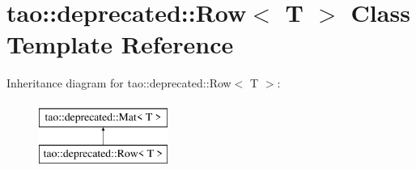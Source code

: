 \hypertarget{classtao_1_1deprecated_1_1_row}{}\section{tao\+::deprecated\+::Row$<$ T $>$ Class Template Reference}
\label{classtao_1_1deprecated_1_1_row}
Inheritance diagram for tao\+::deprecated\+::Row$<$ T $>$\+:\begin{figure}[H]
\begin{center}
\leavevmode
\includegraphics[height=2.000000cm]{classtao_1_1deprecated_1_1_row}
\end{center}
\end{figure}
